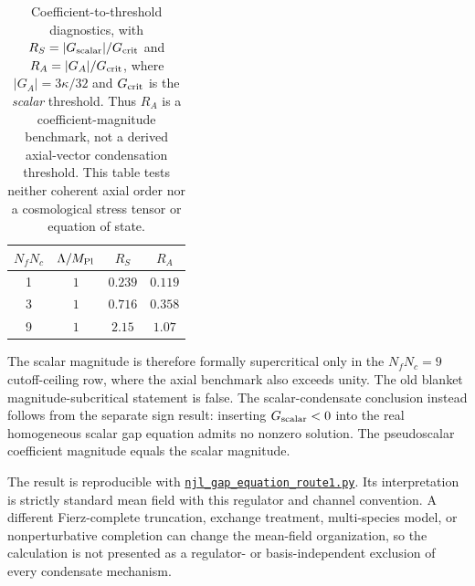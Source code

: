\documentclass[aps,prd,twocolumn,superscriptaddress,showpacs,preprintnumbers,nofootinbib,longbibliography,floatfix]{revtex4-2}
\newcommand{\artifactnamed}[2]{\href{https://github.com/Hubify-Projects/bigbounce/blob/main/#1}{\nolinkurl{#2}}}
\begin{document}
\begin{table}[tb]
\caption{Coefficient-to-threshold diagnostics, with
$R_S=|G_{\rm scalar}|/G_{\rm crit}$ and
$R_A=|G_A|/G_{\rm crit}$, where $|G_A|=3\kappa/32$ and $G_{\rm crit}$ is the
\emph{scalar} threshold.  Thus $R_A$ is a coefficient-magnitude benchmark, not
a derived axial-vector condensation threshold.  This table tests neither
coherent axial order nor a cosmological stress tensor or equation of state.}
\begin{ruledtabular}
\begin{tabular}{cccc}
$N_fN_c$ & $\Lambda/M_{\rm Pl}$ & $R_S$ & $R_A$ \\
\hline
1 & $1$ & $0.239$ & $0.119$ \\
3 & $1$ & $0.716$ & $0.358$ \\
9 & $1$ & $2.15$ & $1.07$ \\
\end{tabular}
\end{ruledtabular}
\end{table}

The scalar magnitude is therefore formally supercritical only in the
$N_fN_c=9$ cutoff-ceiling row, where the axial benchmark also exceeds unity.
The old blanket
magnitude-subcritical statement is false.  The scalar-condensate conclusion
instead follows from the separate sign result: inserting
$G_{\rm scalar}<0$ into the real homogeneous scalar gap equation admits no
nonzero solution.  The pseudoscalar coefficient magnitude equals the scalar
magnitude.

The result is reproducible with
\artifactnamed{arxiv/scripts/njl_gap_equation_route1.py}{njl_gap_equation_route1.py}.  Its interpretation is
strictly standard mean field with this regulator and channel convention.  A
different Fierz-complete truncation, exchange treatment, multi-species model,
or nonperturbative completion can change the mean-field organization, so the
calculation is not presented as a regulator- or basis-independent exclusion
of every condensate mechanism.
\end{document}
